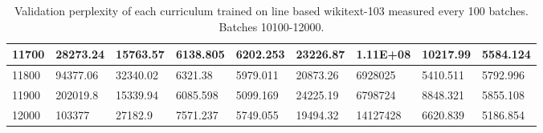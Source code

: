 \documentclass [11pt, proquest] {uwthesis}[2020/12/20]
\begin{document}
\begin{table}
\begin{tiny}
\begin{tabular}{|l|l|l|l|l|l|l|l|l|}
11700 & 28273.24 & 15763.57 & 6138.805 & 6202.253 & 23226.87 & 1.11E+08 & 10217.99 & 5584.124 \\\hline
11800 & 94377.06 & 32340.02 & 6321.38 & 5979.011 & 20873.26 & 6928025 & 5410.511 & 5792.996 \\\hline
11900 & 202019.8 & 15339.94 & 6085.598 & 5099.169 & 24225.19 & 6798724 & 8848.321 & 5855.108 \\\hline
12000 & 103377 & 27182.9 & 7571.237 & 5749.055 & 19494.32 & 14127428 & 6620.839 & 5186.854 \\\hline
\end{tabular}
\end{tiny}
\caption{Validation perplexity of each curriculum trained on line based wikitext-103 measured every 100 batches. Batches 10100-12000.}
\label{tab:wikitext-103-line-3}
\end{table}
\end{document}
